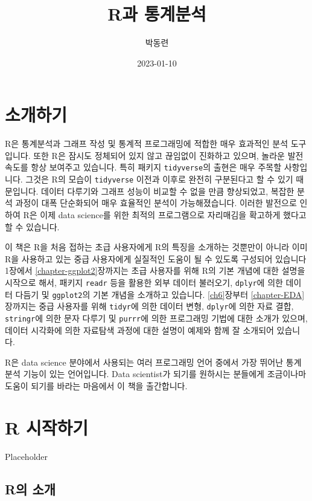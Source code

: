 \documentclass[
]{book}
\title{R과 통계분석}
\author{박동련}
\date{2023-01-10}
\begin{document}
\maketitle

{
\setcounter{tocdepth}{1}
\tableofcontents
}
\hypertarget{uxc18cuxac1cuxd558uxae30}{%
\chapter*{소개하기}\label{uxc18cuxac1cuxd558uxae30}}

R은 통계분석과 그래프 작성 및 통계적 프로그래밍에 적합한 매우 효과적인 분석 도구입니다.
또한 R은 잠시도 정체되어 있지 않고 끊임없이 진화하고 있으며,
놀라운 발전 속도를 항상 보여주고 있습니다.
특히 패키지 \texttt{tidyverse}의 출현은 매우 주목할 사항입니다.
그것은 R의 모습이 \texttt{tidyverse} 이전과 이후로 완전히 구분된다고 할 수 있기 때문입니다.
데이터 다루기와 그래프 성능이 비교할 수 없을 만큼 향상되었고, 복잡한 분석 과정이 대폭 단순화되어 매우 효율적인 분석이 가능해졌습니다.
이러한 발전으로 인하여 R은 이제 data science를 위한 최적의 프로그램으로 자리매김을 확고하게 했다고 할 수 있습니다.

이 책은 R을 처음 접하는 초급 사용자에게 R의 특징을 소개하는 것뿐만이 아니라 이미 R을 사용하고 있는 중급 사용자에게 실질적인 도움이 될 수 있도록 구성되어 있습니다
1장에서 \ref{chapter-ggplot2}장까지는 초급 사용자를 위해 R의 기본 개념에 대한 설명을 시작으로 해서,
패키지 \texttt{readr} 등을 활용한 외부 데이터 불러오기, \texttt{dplyr}에 의한 데이터 다듬기 및 \texttt{ggplot2}의 기본 개념을 소개하고 있습니다.
\ref{ch6}장부터 \ref{chapter-EDA}장까지는 중급 사용자를 위해 \texttt{tidyr}에 의한 데이터 변형, \texttt{dplyr}에 의한 자료 결합, \texttt{stringr}에 의한 문자 다루기 및 \texttt{purrr}에 의한 프로그래밍 기법에 대한 소개가 있으며, 데이터 시각화에 의한 자료탐색 과정에 대한 설명이 예제와 함께 잘 소개되어 있습니다.

R은 data science 분야에서 사용되는 여러 프로그래밍 언어 중에서 가장 뛰어난 통계분석 기능이 있는 언어입니다.
Data scientist가 되기를 원하시는 분들에게 조금이나마 도움이 되기를 바라는 마음에서 이 책을 출간합니다.

\hypertarget{r-uxc2dcuxc791uxd558uxae30}{%
\chapter{R 시작하기}\label{r-uxc2dcuxc791uxd558uxae30}}

Placeholder

\hypertarget{ruxc758-uxc18cuxac1c}{%
\section{R의 소개}\label{ruxc758-uxc18cuxac1c}}
\end{document}
